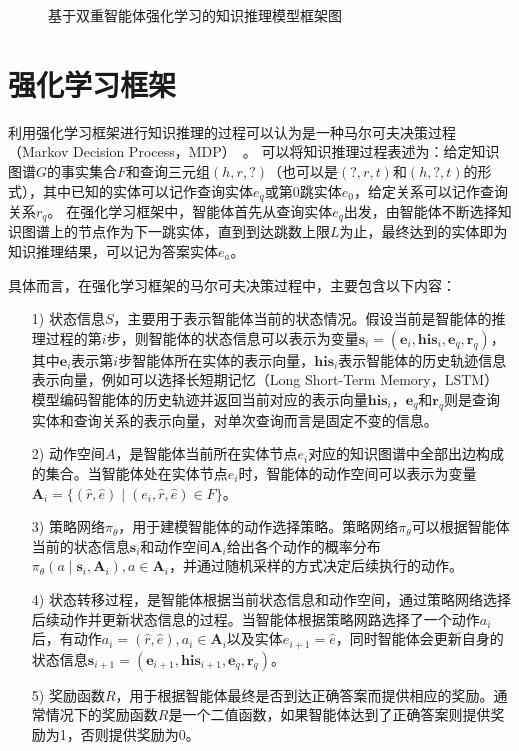 \documentclass[algorithmlist, AutoFakeBold, AutoFakeSlant, figurelist, tablelist, nomlist, engineering]{seuthesix}
\begin{document}
\begin{figure}
  \centering

  \caption{基于双重智能体强化学习的知识推理模型框架图}
  \label{3_LAURA}
\end{figure}

\section{强化学习框架}
利用强化学习框架进行知识推理的过程可以认为是一种马尔可夫决策过程（Markov Decision Process，MDP）~\cite{gronauer2022multi}。
可以将知识推理过程表述为：给定知识图谱$G$的事实集合$F$和查询三元组$(h, r, ?)$（也可以是$(?, r, t)$和$(h, ?, t)$的形式），其中已知的实体可以记作查询实体$e_q$或第0跳实体$e_0$，给定关系可以记作查询关系$r_q$。
在强化学习框架中，智能体首先从查询实体$e_q$出发，由智能体不断选择知识图谱上的节点作为下一跳实体，直到到达跳数上限$L$为止，最终达到的实体即为知识推理结果，可以记为答案实体$e_a$。

具体而言，在强化学习框架的马尔可夫决策过程中，主要包含以下内容：
\begin{itemize}
  \item [1)] 状态信息$S$，主要用于表示智能体当前的状态情况。假设当前是智能体的推理过程的第$i$步，则智能体的状态信息可以表示为变量$\bm{s}_i = (\bm{e}_i, \bm{his}_i, \bm{e}_q, \bm{r}_q)$，其中$\bm{e}_i$表示第$i$步智能体所在实体的表示向量，$\bm{his}_i$表示智能体的历史轨迹信息表示向量，例如可以选择长短期记忆（Long Short-Term Memory，LSTM）模型编码智能体的历史轨迹并返回当前对应的表示向量$\bm{his}_i$，$\bm{e}_q$和$\bm{r}_q$则是查询实体和查询关系的表示向量，对单次查询而言是固定不变的信息。
  \item [2)] 动作空间$A$，是智能体当前所在实体节点$e_i$对应的知识图谱中全部出边构成的集合。当智能体处在实体节点$e_i$时，智能体的动作空间可以表示为变量$\bm{A}_i = \{(\hat{r}, \hat{e}) \mid (e_i, \hat{r}, \hat{e}) \in F\}$。
  \item [3)] 策略网络$\pi_\theta$，用于建模智能体的动作选择策略。策略网络$\pi_\theta$可以根据智能体当前的状态信息$\bm{s}_i$和动作空间$\bm{A}_i$给出各个动作的概率分布$\pi_\theta(a \mid \bm{s}_i, \bm{A}_i), a \in \bm{A}_i$，并通过随机采样的方式决定后续执行的动作。
  \item [4)] 状态转移过程，是智能体根据当前状态信息和动作空间，通过策略网络选择后续动作并更新状态信息的过程。当智能体根据策略网路选择了一个动作$a_i$后，有动作$a_i = (\hat{r}, \hat{e}), a_i \in \bm{A}_i$以及实体$e_{i+1}=\hat{e}$，同时智能体会更新自身的状态信息$\bm{s}_{i+1} = (\bm{e}_{i+1}, \bm{his}_{i+1}, \bm{e}_q, \bm{r}_q)$。
  \item [5)] 奖励函数$R$，用于根据智能体最终是否到达正确答案而提供相应的奖励。通常情况下的奖励函数$R$是一个二值函数，如果智能体达到了正确答案则提供奖励为1，否则提供奖励为0。
\end{itemize}
\end{document}
